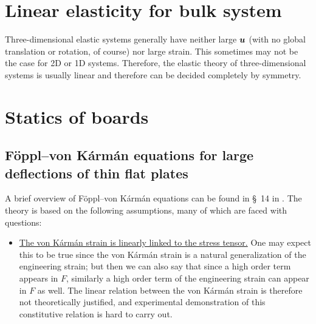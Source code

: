 \documentclass[hyperref, a4paper]{article}
\newcommand*{\citesec}[1]{\S~{#1}}
\begin{document}
\section{Linear elasticity for bulk system}

Three-dimensional elastic systems 
generally have neither large $\vb*{u}$ (with no global translation or rotation, of course)
nor large strain.
This sometimes may not be the case for 2D or 1D systems.
Therefore, the elastic theory of three-dimensional systems 
is usually linear and therefore can be decided completely by symmetry.


\section{Statics of boards}

\subsection{Föppl–von Kármán equations for  large deflections of thin flat plates}

A brief overview of Föppl–von Kármán equations can be found 
in \citesec{14} in \cite{landau1986theory}.
The theory is based on the following assumptions,
many of which are faced with questions:
\begin{itemize}
    \item \ul{The von Kármán strain is linearly linked to the stress tensor.}
    One may expect this to be true since 
    the von Kármán strain is a natural generalization 
    of the engineering strain;
    but then we can also say that 
    since a high order term appears in $F$,
    similarly a high order term of the engineering strain can appear in $F$ as well.
    The linear relation between the von Kármán strain 
    is therefore not theoretically justified,
    and experimental demonstration of this constitutive relation 
    is hard to carry out.
\end{itemize}

\printbibliography
\end{document}
